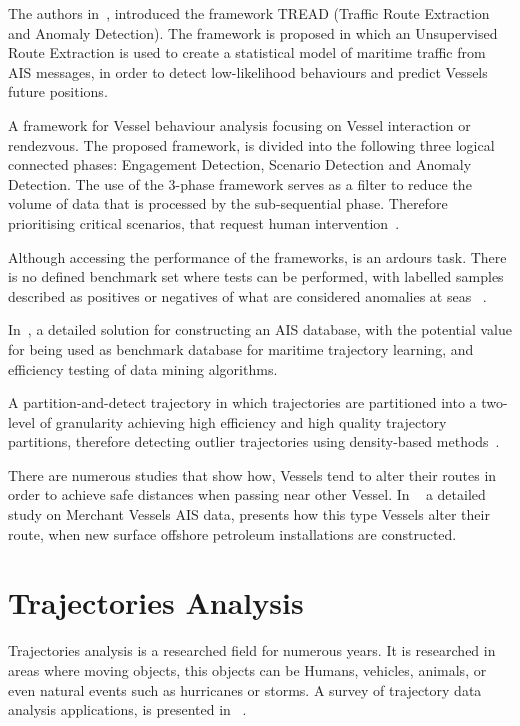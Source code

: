 The authors in~\cite{Pallotta2013}, introduced the framework TREAD (Traffic Route Extraction and Anomaly Detection). The framework is proposed in which an Unsupervised Route Extraction is used to create a statistical model of maritime traffic from AIS messages, in order to detect low-likelihood behaviours and predict Vessels future positions.

A framework for Vessel behaviour analysis focusing on Vessel interaction or rendezvous. The proposed framework, is divided into the following three logical connected phases: Engagement Detection, Scenario  Detection and Anomaly Detection. The use of the 3-phase framework serves as a filter to reduce the volume of data that is processed by the sub-sequential phase. Therefore prioritising critical scenarios, that request human intervention~\cite{Shahir2015}.

Although accessing the performance of the frameworks, is an ardours task. There is no defined benchmark set where tests can be performed, with labelled samples described as positives or negatives of what are considered anomalies at seas ~\cite{Laxhammar2008}. 

In~\cite{Mao2016}, a detailed solution for constructing an AIS database, with the potential value for being used as benchmark database for maritime trajectory learning, and efficiency testing of data mining algorithms.

A partition-and-detect trajectory in which trajectories are partitioned into a two-level of granularity achieving high efficiency and high quality trajectory partitions, therefore detecting outlier trajectories using density-based methods~\cite{Lee}.

There are numerous studies that show how, Vessels tend to alter their routes in order to achieve safe distances when passing near other Vessel. In ~\cite{2017Offshore} a detailed study on Merchant Vessels AIS data, presents how this type Vessels alter their route, when new surface offshore petroleum installations are constructed.

\section{Trajectories Analysis}
\label{section: Trajectory Analysis}
Trajectories analysis is a researched field for numerous years. It is researched in areas where moving objects, this objects can be Humans, vehicles, animals, or even natural events such as hurricanes or storms.
A survey of trajectory data analysis applications, is presented in ~\cite{Feng2016}.

